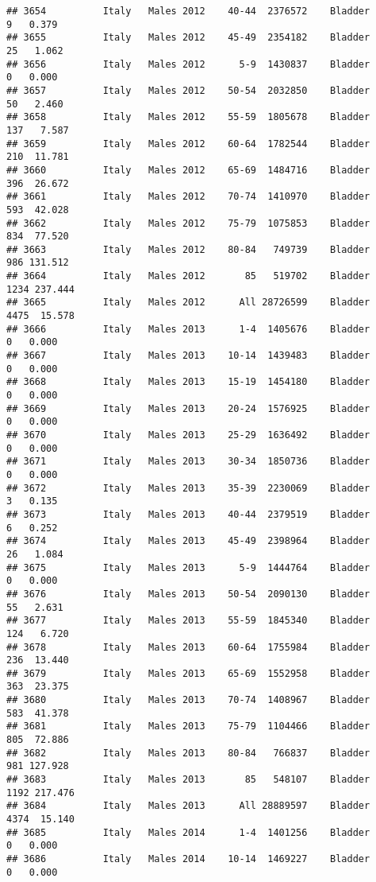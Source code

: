 \documentclass[
]{article}
\begin{document}
\begin{verbatim}
## 3654          Italy   Males 2012    40-44  2376572    Bladder      9   0.379
## 3655          Italy   Males 2012    45-49  2354182    Bladder     25   1.062
## 3656          Italy   Males 2012      5-9  1430837    Bladder      0   0.000
## 3657          Italy   Males 2012    50-54  2032850    Bladder     50   2.460
## 3658          Italy   Males 2012    55-59  1805678    Bladder    137   7.587
## 3659          Italy   Males 2012    60-64  1782544    Bladder    210  11.781
## 3660          Italy   Males 2012    65-69  1484716    Bladder    396  26.672
## 3661          Italy   Males 2012    70-74  1410970    Bladder    593  42.028
## 3662          Italy   Males 2012    75-79  1075853    Bladder    834  77.520
## 3663          Italy   Males 2012    80-84   749739    Bladder    986 131.512
## 3664          Italy   Males 2012       85   519702    Bladder   1234 237.444
## 3665          Italy   Males 2012      All 28726599    Bladder   4475  15.578
## 3666          Italy   Males 2013      1-4  1405676    Bladder      0   0.000
## 3667          Italy   Males 2013    10-14  1439483    Bladder      0   0.000
## 3668          Italy   Males 2013    15-19  1454180    Bladder      0   0.000
## 3669          Italy   Males 2013    20-24  1576925    Bladder      0   0.000
## 3670          Italy   Males 2013    25-29  1636492    Bladder      0   0.000
## 3671          Italy   Males 2013    30-34  1850736    Bladder      0   0.000
## 3672          Italy   Males 2013    35-39  2230069    Bladder      3   0.135
## 3673          Italy   Males 2013    40-44  2379519    Bladder      6   0.252
## 3674          Italy   Males 2013    45-49  2398964    Bladder     26   1.084
## 3675          Italy   Males 2013      5-9  1444764    Bladder      0   0.000
## 3676          Italy   Males 2013    50-54  2090130    Bladder     55   2.631
## 3677          Italy   Males 2013    55-59  1845340    Bladder    124   6.720
## 3678          Italy   Males 2013    60-64  1755984    Bladder    236  13.440
## 3679          Italy   Males 2013    65-69  1552958    Bladder    363  23.375
## 3680          Italy   Males 2013    70-74  1408967    Bladder    583  41.378
## 3681          Italy   Males 2013    75-79  1104466    Bladder    805  72.886
## 3682          Italy   Males 2013    80-84   766837    Bladder    981 127.928
## 3683          Italy   Males 2013       85   548107    Bladder   1192 217.476
## 3684          Italy   Males 2013      All 28889597    Bladder   4374  15.140
## 3685          Italy   Males 2014      1-4  1401256    Bladder      0   0.000
## 3686          Italy   Males 2014    10-14  1469227    Bladder      0   0.000

\end{verbatim}
\end{document}
